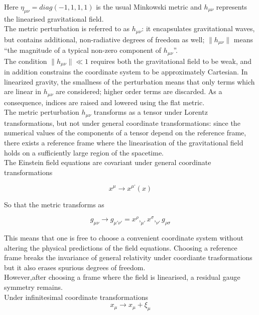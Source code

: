 \documentclass[binding=0.6cm, LaM]{sapthesis}
\begin{document}
	Here $\eta_{\mu\nu} = diag(-1,1,1,1)$ is the usual Minkowski metric and $h_{\mu\nu}$ 
	represents the linearised gravitational field. \\
	The metric perturbation is referred to as  $h_{\mu\nu}$: it encapsulates gravitational waves, 
	but contains additional, non-radiative degrees of freedom as well; $\|h_{\mu\nu}\|$ means
	“the magnitude of a typical non-zero component of $h_{\mu\nu}$”. \\ 
	The condition $\|h_{\mu\nu}\|\ll 1$ requires both the gravitational field to be weak, 
	and in addition constrains the coordinate system to be approximately Cartesian.  
	In linearized gravity, the smallness of the perturbation means that only terms which are linear in $h_{\mu\nu}$ are considered;
	higher order terms are discarded. As a consequence, indices are raised and lowered using the flat metric. \\
	The metric perturbation $h_{\mu\nu}$ transforms as a tensor under Lorentz transformations, 
	but not under general coordinate transformations: since the numerical values of the components
	of a tensor depend on the reference frame, there exists a reference frame where 
	the linearisation of the gravitational field holds on a sufficiently large region of the spacetime. \\
	The Einstein field equations are covariant under general coordinate transformations

		\begin{equation}
		x^{\mu} \rightarrow x^{\mu ‘}(x)
		\end{equation}

	So that the metric transforms as

		\begin{equation}
		g_{\mu\nu} \rightarrow g_{\mu' \nu'} = x^{\rho},_{\mu'}x^{\sigma},_{\nu'}g_{\rho \sigma}
		\end{equation}

	This means that one is free to choose a convenient coordinate system without 
	altering the physical predictions of the field equations.
	Choosing a reference frame breaks the invariance of general relativity under 
	coordiante trasformations but it also erases spurious degrees of freedom. \\
	However,after choosing a frame where the field is linearised, 
	a residual gauge symmetry remains. \\
	Under infinitesimal coordinate transformations
                 \[
		x_{\mu} \rightarrow x_{\mu} + \xi_{\mu}
                \]
\end{document}
